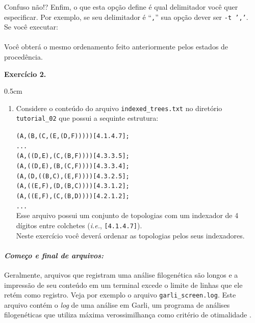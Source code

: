 \begin{refsection}
Confuso não!? Enfim, o que esta opção define é qual delimitador você quer especificar. Por exemplo, se seu delimitador é ``\texttt{,}'' sua opção dever ser \texttt{-t ','}.\\

Se você executar:\\
\\

Você obterá o mesmo ordenamento feito anteriormente pelos estados de procedência.\\

\begin{blackBlock}{\textbf{Exercício 2.}}\label{tut2:ex:2.\arabic{ex}}

\begin {myindentpar}{0.5cm}
\begin{enumerate}[\itshape i.]

 \item{Considere o conteúdo do arquivo \texttt{indexed\_trees.txt} no diretório \texttt{tutorial\_02} que possui a sequinte estrutura:}

\texttt{(A,(B,(C,(E,(D,F)))))[4.1.4.7];}\\
\texttt{...}\\
\texttt{(A,((D,E),(C,(B,F))))[4.3.3.5];}\\
\texttt{(A,((D,E),(B,(C,F))))[4.3.3.4];}\\
\texttt{(A,(D,((B,C),(E,F))))[4.3.2.5];}\\
\texttt{(A,((E,F),(D,(B,C))))[4.3.1.2];}\\
\texttt{(A,((E,F),(C,(B,D))))[4.2.1.2];}\\
\texttt{...}\\

Esse arquivo possui um conjunto de topologias com um indexador de 4 dígitos entre colchetes (\textit{i.e.}, \texttt{[4.1.4.7]}).\\
Neste exercício você deverá ordenar as topologias pelos seus indexadores.

\end{enumerate}
\end{myindentpar}

\end{blackBlock}


\paragraph{\textit{Começo e final de arquivos:}}\label{tut2:text:editors:texttools:headtail}
Geralmente, arquivos que registram uma análise filogenética são longos e a impressão de seu conteúdo em um terminal excede o limite de linhas que ele retém como registro. Veja por exemplo o arquivo \texttt{garli\_screen.log}. Este arquivo contém o \textit{log} de uma análise em Garli, um programa de análises filogenéticas que utiliza máxima verossimilhança como critério de otimalidade \parencite{Zwickl_2006}.\\


\end{refsection}
